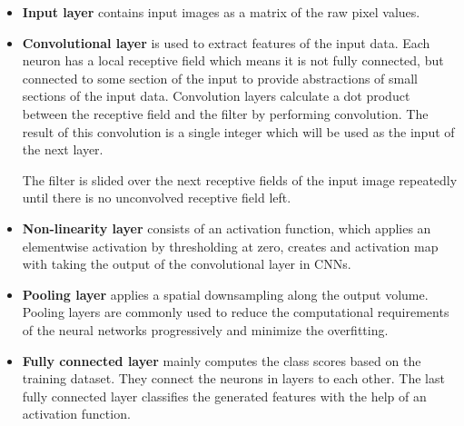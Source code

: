     \begin{itemize}

        \item \textbf{Input layer} contains input images as a matrix of the raw pixel values.

        \item \textbf{Convolutional layer} is used to extract features of the input data.
            Each neuron has a local receptive field which means it is not fully connected, but connected to some section of the input to provide abstractions of small sections of the input data.
            Convolution layers calculate a dot product between the receptive field and the filter by performing convolution.
            The result of this convolution is a single integer which will be used as the input of the next layer.

            The filter is slided over the next receptive fields of the input image repeatedly until there is no unconvolved receptive field left.

        \item \textbf{Non-linearity layer} consists of an activation function, which applies an elementwise activation by thresholding at zero, creates and activation map with taking the output of the convolutional layer in CNNs.

        \item \textbf{Pooling layer} applies a spatial downsampling along the output volume.
            Pooling layers are commonly used to reduce the computational requirements of the neural networks progressively and minimize the overfitting.

        \item \textbf{Fully connected layer} mainly computes the class scores based on the training dataset.
            They connect the neurons in layers to each other.
            The last fully connected layer classifies the generated features with the help of an activation function.

    \end{itemize}


